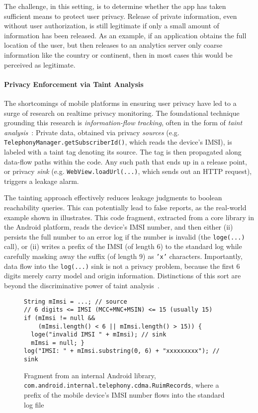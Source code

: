 The challenge, in this setting, is to determine whether the app has taken sufficient means to protect user privacy. Release of private information, even without user authorization, is still legitimate if only a small amount of information has been released. As an example, if an application obtains the full location of the user, but then releases to an analytics server only coarse information like the country or continent, then in most cases this would be perceived as legitimate.

\paragraph{Privacy Enforcement via Taint Analysis} The shortcomings of mobile platforms in ensuring user privacy have led to a surge of research on realtime privacy monitoring. The foundational technique grounding this research is \emph{information-flow tracking}, often in the form of \emph{taint analysis}~\cite{TPFSW:PLDI09,NS:NDSS05}: Private data, obtained via privacy \emph{sources} (e.g. {\tt TelephonyManager.getSubscriberId()}, which reads the device's IMSI), is labeled with a taint tag denoting its source. The tag is then propagated along data-flow paths within the code. Any such path that ends up in a release point, or privacy \emph{sink} (e.g. {\tt WebView.loadUrl(...)}, which sends out an HTTP request), triggers a leakage alarm.

The tainting approach effectively reduces leakage judgments to boolean reachability queries. This can potentially lead to false reports, as the real-world example shown in  illustrates. This code fragment, extracted from a core library in the Android platform, reads the device's IMSI number, and then either (ii) persists the full number to an error log if the number is invalid (the {\tt loge(...)} call), or (ii) writes a prefix of the IMSI (of length 6) to the standard log while carefully masking away the suffix (of length 9) as {\tt 'x'} characters. Importantly, data flow into the {\tt log(...)} sink is not a privacy problem, because the first 6 digits merely carry model and origin information. Distinctions of this sort are beyond the discriminative power of taint analysis~\cite{WCGHHJSW:HOTOS13}.

\begin{figure}
\begin{lstlisting}
String mImsi = ...; // source
// 6 digits <= IMSI (MCC+MNC+MSIN) <= 15 (usually 15)
if (mImsi != null &&
    (mImsi.length() < 6 || mImsi.length() > 15)) {
  loge("invalid IMSI " + mImsi); // sink
  mImsi = null; }
log("IMSI: " + mImsi.substring(0, 6) + "xxxxxxxxx"); // sink 
\end{lstlisting}
\caption{\label{Fi:quantitative}Fragment from an internal Android library, {\tt com.android.internal.telephony.cdma.RuimRecords}, where a prefix of the mobile device's IMSI number flows into the standard log file}
\end{figure}

